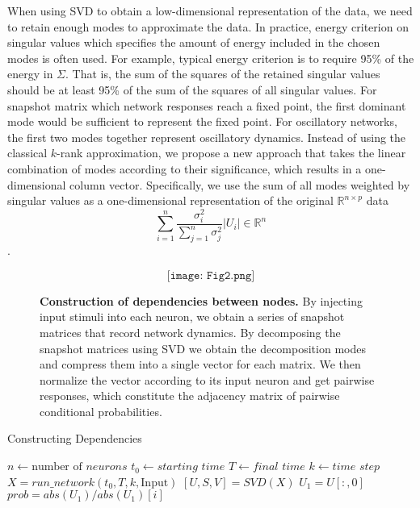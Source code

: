 \documentclass[letterpaper,11pt]{article}
\begin{document}
When using SVD to obtain a low-dimensional representation of the data, we need to retain enough modes to approximate the data. In practice, energy criterion on singular values which specifies the amount of energy included in the chosen modes is often used. For example, typical energy criterion is to require 95\% of the energy in $\Sigma$. That is, the sum of the squares of the retained singular values should be at least 95\% of the sum of the squares of all singular values. For snapshot matrix which network responses reach a fixed point, the first dominant mode would be sufficient to represent the fixed point. For oscillatory networks, the first two modes together represent oscillatory dynamics. Instead of using the classical $k$-rank approximation, we propose a new approach that takes the linear combination of modes according to their significance, which results in a one-dimensional column vector. Specifically, we use the sum of all modes weighted by singular values as a one-dimensional representation of the original $\mathbb{R}^{n\times p}$ data
\[\sum_{i=1}^n \frac{\sigma_i^2}{\sum_{j=1}^n \sigma_j^2} |U_i|\in\mathbb{R}^n\].
\begin{figure}[h!]
  \[\texttt{[image: Fig2.png]}\]
  \caption{\textbf{Construction of dependencies between nodes.} By injecting input stimuli into each neuron, we obtain a series of snapshot matrices that record network dynamics. By decomposing the snapshot matrices using SVD we obtain the decomposition modes and compress them into a single vector for each matrix. We then normalize the vector according to its input neuron and get pairwise responses, which constitute the adjacency matrix of pairwise conditional probabilities.}
\end{figure}

\begin{algorithm}
\caption{Constructing Dependencies}\label{prob}
\begin{algorithmic}[1]
\State $n \gets \text{number of }\textit{neurons}$
\State $t_0 \gets \textit{starting time}$
\State $T \gets \textit{final time}$
\State $k \gets \textit{time step}$
\State $X=run\_network(t_0, T,k,\text{Input})$
\State $[U,S,V]=SVD(X)$
\State $U_1=U[:,0]$
\State $prob=abs(U_1)/abs(U_1)[i]$
\EndFor
\end{algorithmic}
\end{algorithm}
\end{document}
